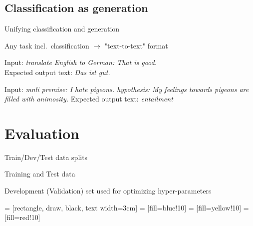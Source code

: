 \documentclass[12pt,aspectratio=169,handout]{beamer}
\begin{document}
\subsection{Classification as generation}

\begin{frame}{Unifying classification and generation}

Any task incl.\ classification $\to$ "text-to-text" format

\begin{example}[Translation En-De]
Input: \emph{translate English to German: That is good.} \\
Expected output text: \emph{Das ist gut.}
\end{example}

\begin{example}[MNLI]
Input: \emph{mnli premise: I hate pigeons. hypothesis: My feelings towards pigeons are filled with animosity.}
Expected output text: \emph{entailment}
\end{example}


\end{frame}



\section{Evaluation}


\begin{frame}{ Train/Dev/Test data splits}

Training and Test data

Development (Validation) set used for optimizing hyper-parameters

 = [rectangle, draw, black, text width=3cm]
 = [fill=blue!10]
 = [fill=yellow!10]
 = [fill=red!10]

\begin{figure}


\end{figure}

\end{frame}
\end{document}
